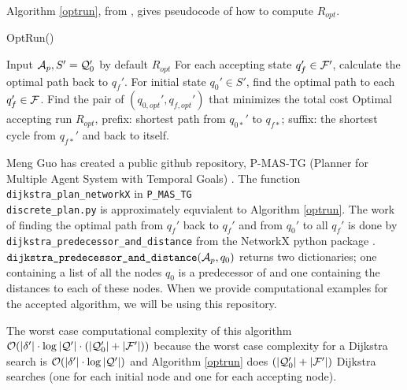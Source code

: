 Algorithm \ref{optrun}, from \cite{guo15}, gives pseudocode of how to compute $R_{opt}$.
\begin{algorithm}
\caption{OptRun()}\label{optrun}
\begin{algorithmic}[1]
\Require Input $\mathcal{A}_p, S' = \mathcal{Q}_0'$ by default
\Ensure $R_{opt}$
\State For each accepting state $q_f' \in \mathcal{F}'$, calculate the optimal path back to $q_f'$. 
\State For initial state $q_0' \in S'$, find the optimal path to each $q_f' \in \mathcal{F}$.
\State Find the pair of $(q_{0,opt}',q_{f,opt}')$ that minimizes the total cost
\State Optimal accepting run $R_{opt}$, prefix: shortest path from $q_{0*}'$ to  $q_{f*}$; suffix: the shortest cycle from $q_{f*}'$ and back to itself.
\end{algorithmic}
\end{algorithm}

Meng Guo has created a public github repository, P-MAS-TG (Planner for Multiple Agent System with Temporal Goals) \cite{pMasGit}. The function \texttt{dijkstra\_plan\_networkX} in \texttt{P\_MAS\_TG\\discrete\_plan.py} is approximately equvialent to Algorithm \ref{optrun}. The work of finding the optimal path from $q_f'$ back to $q_f'$ and from $q_0'$ to all $q_f'$ is done by \texttt{dijkstra\_predecessor\_and\_distance} from the NetworkX python package \cite{schult08}. $\texttt{dijkstra\_predecessor\_and\_distance}(\mathcal{A}_p,q_0)$ returns two dictionaries; one containing a list of all the nodes $q_0$ is a predecessor of and one containing the distances to each of these nodes. When we provide computational examples for the accepted algorithm, we will be using this repository. %


The worst case computational complexity of this algorithm $\mathcal{O}(|\delta'| \cdot \log|\mathcal{Q}'| \cdot (|\mathcal{Q}_0'| + |\mathcal{F}'|))$ because the worst case complexity for a Dijkstra search is $\mathcal{O}(|\delta'| \cdot \log|\mathcal{Q}'| )$ and Algorithm \ref{optrun} does $(|\mathcal{Q}_0'| + |\mathcal{F}'|)$ Dijkstra searches (one for each initial node and one for each accepting node).

